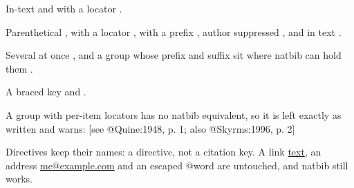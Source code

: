 In-text \citet{Quine:1948} and with a locator \citet[p. 33]{Quine:1948}.

Parenthetical \citep{Quine:1948}, with a locator \citep[p. 33]{Quine:1948}, with a prefix
\citep[see][p. 33]{Quine:1948}, author suppressed \citeyearpar{Quine:1948}, and in text \citeyear{Quine:1948}.

Several at once \citep{Quine:1948,Skyrms:1996}, and a group whose prefix and suffix
sit where natbib can hold them \citep[see][pp. 3-5]{Quine:1948,Skyrms:1996}.

A braced key \citet{Quine:1948} and \citep[chap. 2]{Skyrms:1996}.

A group with per-item locators has no natbib equivalent, so it is left exactly as
written and warns: [see @Quine:1948, p. 1; also @Skyrms:1996, p. 2]

Directives keep their names: a directive, not a citation key. A link
\href{http://example.com}{text}, an address \href{mailto:me@example.com}{me@example.com} and an escaped @word are
untouched, and natbib \citep[cf.][p. 9]{Quine:1948} still works.


\renewcommand{\refname}{References}


